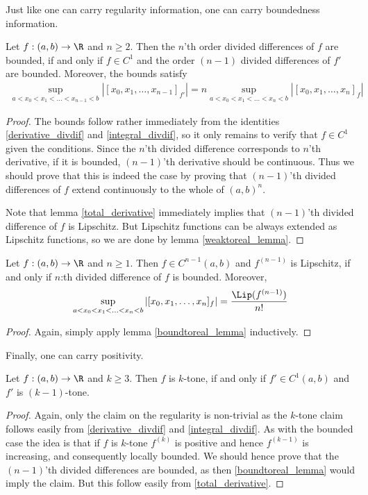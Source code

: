 Just like one can carry regularity information, one can carry boundedness information.

\begin{lem}\label{boundtoreal_lemma}
	Let $f : (a, b) \to \R$ and $n \geq 2$. Then the $n$'th order divided differences of $f$ are bounded, if and only if $f \in C^{1}$ and the order $(n - 1)$ divided differences of $f'$ are bounded. Moreover, the bounds satisfy
	\begin{align*}
		\sup_{a < x_{0} < x_{1} < \ldots < x_{n - 1} < b} |[x_{0}, x_{1}, \ldots, x_{n - 1}]_{f'}| = n \sup_{a < x_{0} < x_{1} < \ldots < x_{n}< b} |[x_{0}, x_{1}, \ldots, x_{n}]_{f}|
	\end{align*}
\end{lem}
\begin{proof}
	The bounds follow rather immediately from the identities \ref{derivative_divdif} and \ref{integral_divdif}, so it only remains to verify that $f \in C^{1}$ given the conditions. Since the $n$'th divided difference corresponds to $n$'th derivative, if it is bounded, $(n - 1)$'th derivative should be continuous. Thus we should prove that this is indeed the case by proving that $(n - 1)$'th divided differences of $f$ extend continuously to the whole of $(a, b)^{n}$.

	Note that lemma \ref{total_derivative} immediately implies that $(n - 1)$'th divided difference of $f$ is Lipschitz. But Lipschitz functions can be always extended as Lipschitz functions, so we are done by lemma \ref{weaktoreal_lemma}.
\end{proof}

\begin{lause}\label{bounded_div}
	Let $f : (a, b) \to \R$ and $n \geq 1$. Then $f \in C^{n - 1}(a, b)$ and $f^{(n - 1)}$ is Lipschitz, if and only if $n$:th divided difference of $f$ is bounded. Moreover,
	\begin{align*}
		\sup_{a < x_{0} < x_{1} < \ldots < x_{n}< b} |[x_{0}, x_{1}, \ldots, x_{n}]_{f}| = \frac{\Lip(f^{(n - 1)})}{n!}
	\end{align*}
\end{lause}
\begin{proof}
	Again, simply apply lemma \ref{boundtoreal_lemma} inductively.
\end{proof}

Finally, one can carry positivity.

\begin{lem}\label{postoreal_lemma}
	Let $f : (a, b) \to \R$ and $k \geq 3$. Then $f$ is $k$-tone, if and only if $f' \in C^{1}(a, b)$ and $f'$ is $(k - 1)$-tone.
\end{lem}
\begin{proof}
	Again, only the claim on the regularity is non-trivial as the $k$-tone claim follows easily from  \ref{derivative_divdif} and \ref{integral_divdif}. As with the bounded case the idea is that if $f$ is $k$-tone $f^{(k)}$ is positive and hence $f^{(k - 1)}$ is increasing, and consequently locally bounded. We should hence prove that the $(n - 1)$'th divided differences are bounded, as then \ref{boundtoreal_lemma} would imply the claim. But this follow easily from \ref{total_derivative}.
\end{proof}

